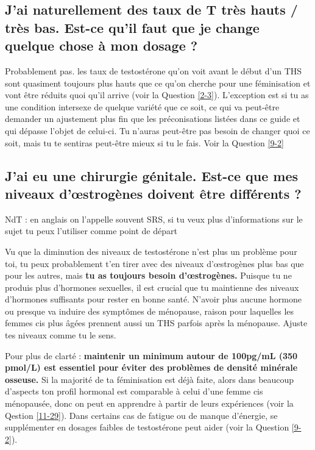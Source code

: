 \documentclass{article}
\begin{document}
\subsection{J'ai naturellement des taux de T très hauts / très bas. Est-ce qu'il faut que je change quelque chose à mon dosage ?}

Probablement pas. les taux de testostérone qu'on voit avant le début d'un THS sont quasiment toujours plus hauts que ce qu'on cherche pour une féminisation et vont être réduits quoi qu'il arrive (voir la Question \ref{2-3}). L'exception est si tu as une condition intersexe de quelque variété que ce soit, ce qui va peut-être demander un ajustement plus fin que les préconisations listées dans ce guide et qui dépasse l'objet de celui-ci. Tu n'auras peut-être pas besoin de changer quoi ce soit, mais tu te sentiras peut-être mieux si tu le fais. Voir la Question \ref{9-2}

\subsection{J'ai eu une chirurgie génitale. Est-ce que mes niveaux d'œstrogènes doivent être différents ?}

NdT : en anglais on l'appelle souvent SRS, si tu veux plus d'informations sur le sujet tu peux l'utiliser comme point de départ

Vu que la diminution des niveaux de testostérone n'est plus un problème pour toi, tu peux probablement t'en tirer avec des niveaux d'œstrogènes plus bas que pour les autres, mais \textbf{tu as toujours besoin d'œstrogènes.} Puisque tu ne produis plus d'hormones sexuelles, il est crucial que tu maintienne des niveaux d'hormones suffisants pour rester en bonne santé. N'avoir plus aucune hormone ou presque va induire des symptômes de ménopause, raison pour laquelles les femmes cis plus âgées prennent aussi un THS parfois après la ménopause. Ajuste tes niveaux comme tu le sens.

Pour plus de clarté : \textbf{maintenir un minimum autour de 100pg/mL (350 pmol/L) est essentiel pour éviter des problèmes de densité minérale osseuse.} Si la majorité de ta féminisation est déjà faite, alors dans beaucoup d'aspects ton profil hormonal est comparable à celui d'une femme cis ménopausée, donc on peut en apprendre à partir de leurs expériences (voir la Qestion \ref{11-29}). Dans certains cas de fatigue ou de manque d'énergie, se supplémenter en dosages faibles de testostérone peut aider (voir la Question \ref{9-2}). 
\end{document}
